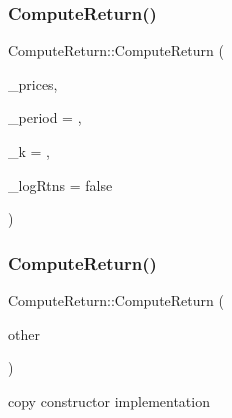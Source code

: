 \hypertarget{classComputeReturn_a2e58c2c7e9d0f2735ceb9fdcdf0dcdde}{}\label{classComputeReturn_a2e58c2c7e9d0f2735ceb9fdcdf0dcdde} 
\subsubsection{\texorpdfstring{Compute\+Return()}{ComputeReturn()}\hspace{0.1cm}{\footnotesize\ttfamily [3/4]}}
{\footnotesize\ttfamily Compute\+Return\+::\+Compute\+Return (\begin{DoxyParamCaption}\item[{const \hyperlink{compute__returns__eigen_8h_ae14dd28696f743e067dbd2594616bad6}{Mat} \&}]{\+\_\+prices,  }\item[{unsigned int}]{\+\_\+period = {},  }\item[{unsigned int}]{\+\_\+k = {},  }\item[{bool}]{\+\_\+log\+Rtns = {\ttfamily false} }\end{DoxyParamCaption})}

\hypertarget{classComputeReturn_aa737a4b9280f349201191db08e95ce9a}{}\label{classComputeReturn_aa737a4b9280f349201191db08e95ce9a} 
\subsubsection{\texorpdfstring{Compute\+Return()}{ComputeReturn()}\hspace{0.1cm}{\footnotesize\ttfamily [4/4]}}
{\footnotesize\ttfamily Compute\+Return\+::\+Compute\+Return (\begin{DoxyParamCaption}\item[{const \hyperlink{classComputeReturn}{Compute\+Return} \&}]{other }\end{DoxyParamCaption})}



copy constructor implementation 

\hypertarget{classComputeReturn_adf0a518447b70fd8990c2e06be3edb1b}{}\label{classComputeReturn_adf0a518447b70fd8990c2e06be3edb1b} 
